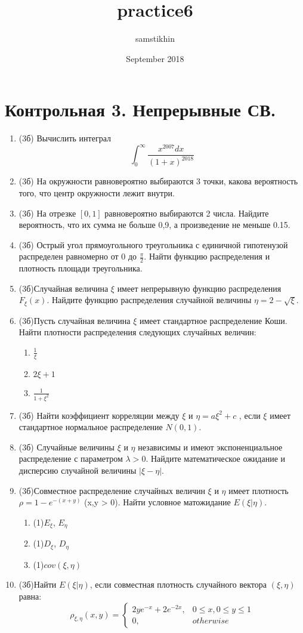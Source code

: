 \documentclass[a4paper, 14pt]{extarticle}
\title{practice6}
\author{samstikhin}
\date{September 2018}
\begin{document}
\section*{Контрольная 3. Непрерывные СВ.}
\begin{enumerate}
\item (3б) Вычислить интеграл
$$\int_0^{\infty} \frac{x^{2007}dx}{(1+x)^{2018}}$$
\item (3б) На окружности равновероятно выбираются 3 точки, какова вероятность того, что центр окружности лежит внутри.
\item (3б) На отрезке $[0,1]$ равновероятно выбираются 2 числа. Найдите вероятность, что их сумма не больше 0,9, а произведение не меньше 0.15.
\item (3б) Острый угол прямоугольного треугольника с единичной гипотенузой распределен равномерно от 0 до $\frac{\pi}{2}$. 
Найти функцию распределения и плотность площади треугольника.
\item (3б)Случайная величина $\xi$ имеет непрерывную функцию распределения $F_{\xi}(x)$. 
Найдите функцию распределения случайной величины $\eta=2-\sqrt{\xi}$.
\item (3б)Пусть случайная величина $\xi$ имеет стандартное распределение
Коши. Найти плотности распределения следующих случайных величин:
\begin{enumerate}
\item $\frac{1}{\xi}$
\item $2\xi + 1$
\item $\frac{1}{1+\xi^2}$
\end{enumerate}
\item (3б) Найти коэффициент корреляции между $\xi$ и $\eta = a\xi^2 + c$ , если 
$\xi$ имеет стандартное нормальное распределение $N(0,1)$.
\item (3б) Случайные величины $\xi$ и $\eta$
независимы и имеют экспоненциальное распределение с параметром
$\lambda>0$. Найдите математическое ожидание и дисперсию случайной величины
$|\xi - \eta|$.


\item (3б)Совместное распределение случайных величин $\xi$ и $\eta$ имеет плотность $\rho = 1-e^{-(x+y)}$ (x,y > 0). 
Найти условное матожидание $E(\xi|\eta)$.
\begin{enumerate}
\item (1)$E_{\xi}$, $E_{\eta}$
\item (1)$D_{\xi}$, $D_{\eta}$
\item (1)$cov(\xi,\eta)$
\end{enumerate}

\item (3б)Найти $E(\xi|\eta)$, если совместная плотность случайного вектора
$(\xi, \eta)$ равна:
	$$\rho_{\xi,\eta}(x,y) =\left\{
	\begin{array}{cc}
	2ye^{-x}+2e^{-2x}, & 0\leq x, 0\leq y\leq 1 \\
	0, & otherwise
\end{array}\right.$$





\end{enumerate}
\end{document}
